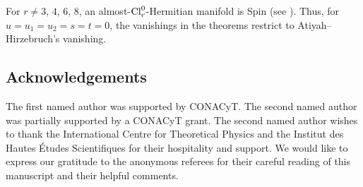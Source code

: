 \documentclass[pdftex]{sigma}
\numberwithin{equation}{section}
\begin{document}
\begin{Remark}For $r\not = 3,\,4,\,6,\,8$, an almost-${\rm Cl}_r^0$-Hermitian manifold is Spin (see \cite[Theo\-rem~4.1]{Arizmendi-Garcia-Herrera}). Thus, for $u=u_1=u_2=s=t=0$, the vanishings in the theorems restrict to Atiyah--Hirzebruch's vanishing.
\end{Remark}

\subsection*{Acknowledgements}

The f\/irst named author was supported by CONACyT. The second named author was partially supported by a CONACyT grant. The second named author wishes to thank the International Centre for Theoretical Physics and the Institut des Hautes \'Etudes Scientif\/iques for their hospitality and support. We would like to express our gratitude to the anonymous referees for their careful reading of this manuscript and their helpful comments.
\end{document}
